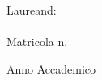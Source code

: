 {\begin{titlepage}
    \vspace*{10mm}

    \begin{flushright}
        {\fontsize{17}{17}\selectfont 
            Laureand\@gender:\\
            \@author\\
            Matricola n. \@studentno\\
        }

    \end{flushright}


    \vfill
    \begin{center}
    {\fontsize{17}{17}\selectfont 
        Anno Accademico \@date%
    }
    \end{center}
\end{titlepage}
\restoregeometry%
\cleardoublepage%
}
\makeatother